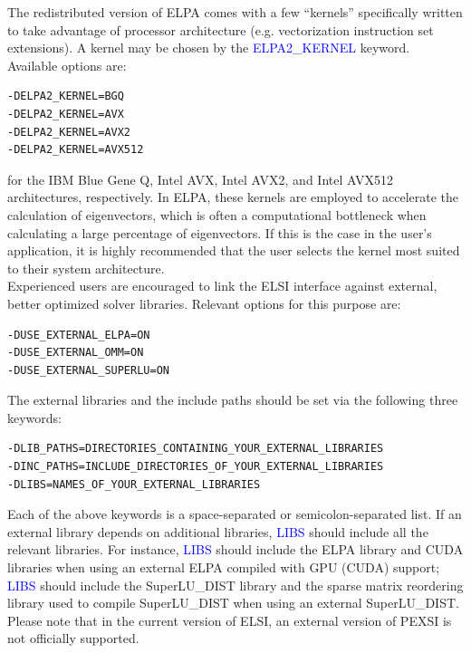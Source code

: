 \documentclass{report}
\begin{document}
The redistributed version of ELPA comes with a few ``kernels'' specifically written to take advantage of processor architecture (e.g. vectorization instruction set extensions).  A kernel may be chosen by the \textcolor{blue}{ELPA2\_KERNEL} keyword.  Available options are:\\

\begin{verbatim}
-DELPA2_KERNEL=BGQ
-DELPA2_KERNEL=AVX
-DELPA2_KERNEL=AVX2
-DELPA2_KERNEL=AVX512
\end{verbatim}

for the IBM Blue Gene Q, Intel AVX, Intel AVX2, and Intel AVX512 architectures, respectively.  In ELPA, these kernels are employed to accelerate the calculation of eigenvectors, which is often a computational bottleneck when calculating a large percentage of eigenvectors.  If this is the case in the user's application, it is highly recommended that the user selects the kernel most suited to their system architecture.\\

Experienced users are encouraged to link the ELSI interface against external, better optimized solver libraries.  Relevant options for this purpose are:\\

\begin{verbatim}
-DUSE_EXTERNAL_ELPA=ON
-DUSE_EXTERNAL_OMM=ON
-DUSE_EXTERNAL_SUPERLU=ON
\end{verbatim}

The external libraries and the include paths should be set via the following three keywords:\\

\begin{verbatim}
-DLIB_PATHS=DIRECTORIES_CONTAINING_YOUR_EXTERNAL_LIBRARIES
-DINC_PATHS=INCLUDE_DIRECTORIES_OF_YOUR_EXTERNAL_LIBRARIES
-DLIBS=NAMES_OF_YOUR_EXTERNAL_LIBRARIES
\end{verbatim}

Each of the above keywords is a space-separated or semicolon-separated list.  If an external library depends on additional libraries, \textcolor{blue}{LIBS} should include all the relevant libraries.  For instance, \textcolor{blue}{LIBS} should include the ELPA library and CUDA libraries when using an external ELPA compiled with GPU (CUDA) support; \textcolor{blue}{LIBS} should include the SuperLU\_DIST library and the sparse matrix reordering library used to compile SuperLU\_DIST when using an external SuperLU\_DIST.  Please note that in the current version of ELSI, an external version of PEXSI is not officially supported.\\
\end{document}
